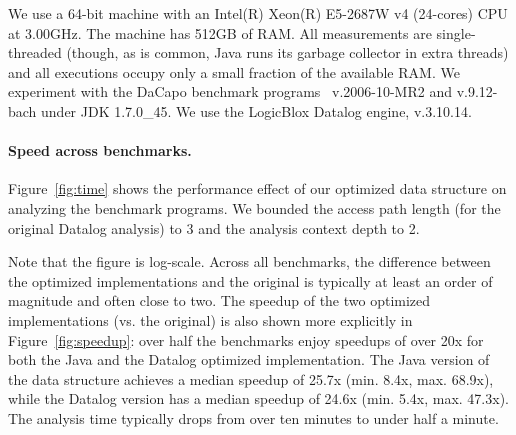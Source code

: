 
We use a 64-bit machine with an Intel(R) Xeon(R) E5-2687W v4 (24-cores) CPU
at 3.00GHz. The machine has 512GB of RAM. All measurements are single-threaded
(though, as is common, Java runs its garbage collector in extra threads) and
all executions occupy only a small fraction of the available RAM. We experiment
with the DaCapo benchmark programs~\cite{oopsla:2006:Blackburn} v.2006-10-MR2 and
v.9.12-bach under JDK 1.7.0\_45.  We use the LogicBlox Datalog engine,
v.3.10.14.

\paragraph{Speed across benchmarks.}

Figure~\ref{fig:time} shows the performance effect of our optimized
data structure on analyzing the benchmark programs. We bounded the
access path length (for the original Datalog analysis) to 3 and the
analysis context depth to 2.


Note that the figure is log-scale. Across all benchmarks, the
difference between the optimized implementations and the original is
typically at least an order of magnitude and often close to two.  The
speedup of the two optimized implementations (vs. the original) is
also shown more explicitly in Figure~\ref{fig:speedup}: over half the
benchmarks enjoy speedups of over 20x for both the Java and the Datalog
optimized implementation. The Java version of the data structure achieves
a median speedup of 25.7x (min. 8.4x, max. 68.9x), while the Datalog
version has a median speedup of 24.6x (min. 5.4x, max. 47.3x). 
The analysis time typically drops from over ten minutes to under half a minute. 

